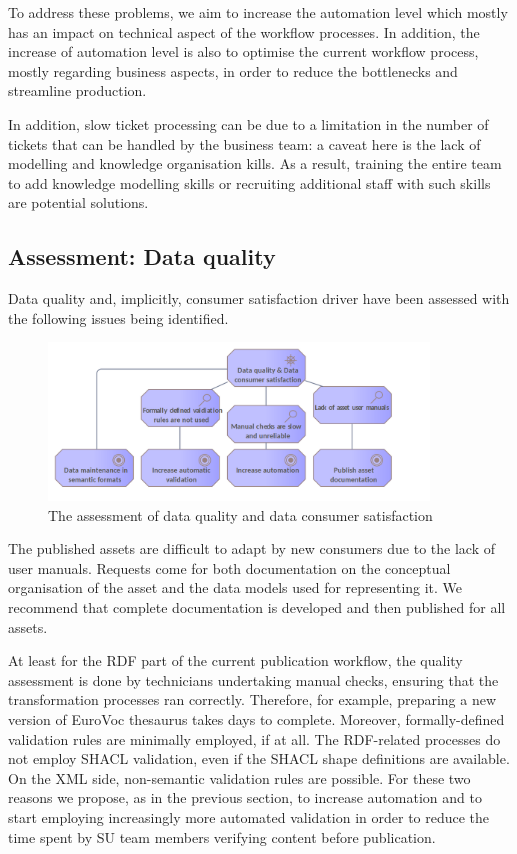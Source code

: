 	To address these problems, we aim to increase the automation level which mostly has an impact on technical aspect of the workflow processes. In addition, the increase of automation level is also to optimise the current workflow process, mostly regarding business aspects, in order to reduce the bottlenecks and streamline production.  
	
	In addition, slow ticket processing can be due to a limitation in the number of tickets that can be handled by the business team: a caveat here is the lack of modelling and knowledge organisation kills. As a result,  training the entire team to add knowledge modelling skills or recruiting additional staff with such skills are potential solutions. 
	

	\subsection{Assessment: Data quality}

    Data quality and, implicitly, consumer satisfaction driver have been assessed with the following issues being identified.
    
	\begin{figure}[!h]
		\centering
		\includegraphics[width=0.9\textwidth]{images/motivation/Data quality.png}
		\caption{The assessment of data quality and data consumer satisfaction}
		\label{fig:data-quality}
	\end{figure}

    The published assets are difficult to adapt by new consumers due to the lack of user manuals. Requests come for both documentation on the conceptual organisation of the asset and the data models used for representing it. We recommend that complete documentation is developed and then published for all assets.
    
    At least for the RDF part of the current publication workflow, the quality assessment is done by technicians undertaking manual checks, ensuring that the transformation processes ran correctly. Therefore, for example, preparing a new version of EuroVoc thesaurus takes days to complete. Moreover, formally-defined validation rules are minimally employed, if at all. The RDF-related processes do not employ SHACL validation, even if the SHACL shape definitions are available. On the XML side, non-semantic validation rules are possible. For these two reasons we propose, as in the previous section, to increase automation and to start employing increasingly more automated validation in order to reduce the time spent by SU team members verifying content before publication. 
    

